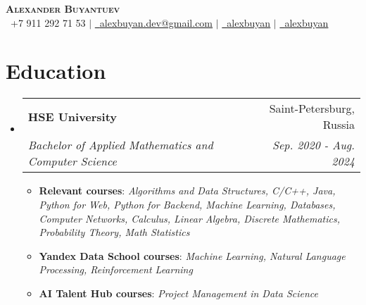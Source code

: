 \documentclass[english,russian,letterpaper,11pt]{article}
\makeatletter
\newcommand{\resumeItem}[1]{
  \item\small{
    {#1 \vspace{-2pt}}
  }
}
\newcommand{\resumeSubheading}[4]{
  \vspace{-2pt}\item
    \begin{tabular*}{0.97\textwidth}[t]{l@{\extracolsep{\fill}}r}
      \textbf{#1} & #2 \\
      \textit{\small#3} & \textit{\small #4} \\
    \end{tabular*}\vspace{-7pt}
}
\newcommand{\resumeSubHeadingListStart}{\begin{itemize}[leftmargin=0.15in, label={}]}
\newcommand{\resumeSubHeadingListEnd}{\end{itemize}}
\newcommand{\resumeItemListStart}{\begin{itemize}}
\newcommand{\resumeItemListEnd}{\end{itemize}\vspace{-5pt}}
\makeatother
\begin{document}

\begin{center}
    \textbf{\Huge \scshape Alexander Buyantuev} \\ \vspace{2pt}
    \small \faPhone \ +7 911 292 71 53 $|$ \href{mailto:alexbuyan.dev@gmail.com}{\faEnvelope \ \underline{alexbuyan.dev@gmail.com}} $|$ 
    \href{https://github.com/alexbuyan}{\faGithub \ \underline{alexbuyan}} $|$ \href{https://www.linkedin.com/in/alexander-buyantuev-063785223}{\faLinkedin \ \underline{alexbuyan}}
\end{center}


\section{Education}
  \resumeSubHeadingListStart
    \resumeSubheading
      {HSE University}{Saint-Petersburg, Russia}
      {Bachelor of Applied Mathematics and Computer Science}{Sep. 2020 - Aug. 2024}
      \resumeItemListStart
        \resumeItem{\textbf{Relevant courses}: \textit{Algorithms and Data Structures, C/C++, Java, Python for Web, Python for Backend, Machine Learning, Databases, Computer Networks, Calculus, Linear Algebra, Discrete Mathematics, Probability Theory, Math Statistics}}
        \resumeItem{\textbf{Yandex Data School courses}: \textit{Machine Learning, Natural Language Processing, Reinforcement Learning}}
        \resumeItem{\textbf{AI Talent Hub courses}: \textit{Project Management in Data Science}}
      \resumeItemListEnd
  \resumeSubHeadingListEnd

\end{document}
